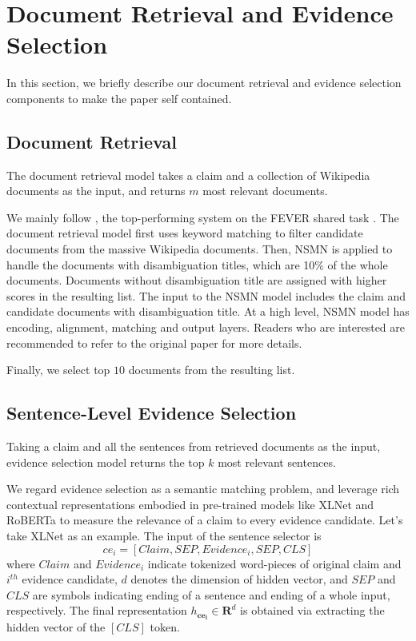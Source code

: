 \documentclass[11pt,a4paper]{article}
\begin{document}
\section{Document Retrieval and Evidence Selection}
In this section, we briefly describe our \mbox{document} retrieval and evidence selection components to make the paper self contained.
\label{sec:document-and-sentence-retrieval}
\subsection{Document Retrieval}
\label{sec:document-retrieval}
The document retrieval model takes a claim and a collection of Wikipedia documents as the input, and returns $m$ most relevant documents. 

We mainly follow , 
the top-performing system on the 
FEVER shared task \cite{thorne2018fact}. 
The document retrieval model first uses {keyword matching} to filter candidate documents from the massive Wikipedia documents.
Then, NSMN \cite{nie2019combining} is applied to handle the documents with disambiguation titles, which are 10\% of the whole documents.
Documents without disambiguation title are assigned with higher scores in the resulting list.
The input to the NSMN model includes
the claim and candidate documents with disambiguation title.
At a high level, NSMN model has 
encoding, alignment, matching and output layers. 
Readers who are interested are recommended to refer to the original paper for more details.




Finally, we select top $10$ documents from the resulting list.


\subsection{Sentence-Level Evidence Selection}
Taking a claim and all the sentences from retrieved documents as the input,
evidence selection model returns the top $k$ most relevant sentences.
\par 
We regard evidence selection as a semantic matching problem, and leverage rich contextual representations embodied in pre-trained models like {XLNet} \cite{yang2019xlnet} and RoBERTa \cite{liu2019roberta} to measure the relevance of a claim to every evidence candidate.
Let's take XLNet as an example.
The input of the sentence selector is \[ce_i = [Claim, SEP, Evidence_i, SEP, CLS]\] where $Claim$ and $Evidence_i$ indicate tokenized word-pieces of original claim and $i^{th}$ evidence candidate, $d$ denotes the dimension of hidden vector, and $SEP$ and $CLS$ are symbols indicating ending of a sentence and ending of a whole input, respectively.
The final representation $h_{\bm{ce_i}} \in \bm{R}^d$ is obtained via extracting the hidden vector of the $[CLS]$ token. 
\end{document}
